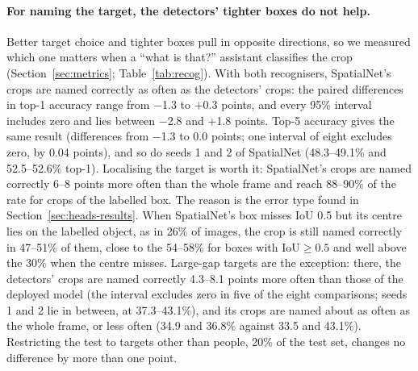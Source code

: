 \paragraph{For naming the target, the detectors' tighter boxes do not help.} Better target choice and tighter boxes pull in opposite directions, so we measured which one matters when a ``what is that?'' assistant classifies the crop (Section~\ref{sec:metrics}; Table~\ref{tab:recog}). With both recognisers, SpatialNet's crops are named correctly as often as the detectors' crops: the paired differences in top-1 accuracy range from $-$1.3 to $+$0.3 points, and every 95\% interval includes zero and lies between $-$2.8 and $+$1.8 points. Top-5 accuracy gives the same result (differences from $-$1.3 to 0.0 points; one interval of eight excludes zero, by 0.04 points), and so do seeds 1 and 2 of SpatialNet (48.3--49.1\% and 52.5--52.6\% top-1). Localising the target is worth it: SpatialNet's crops are named correctly 6--8 points more often than the whole frame and reach 88--90\% of the rate for crops of the labelled box. The reason is the error type found in Section~\ref{sec:heads-results}. When SpatialNet's box misses IoU 0.5 but its centre lies on the labelled object, as in 26\% of images, the crop is still named correctly in 47--51\% of them, close to the 54--58\% for boxes with IoU${\geq}0.5$ and well above the 30\% when the centre misses. Large-gap targets are the exception: there, the detectors' crops are named correctly 4.3--8.1 points more often than those of the deployed model (the interval excludes zero in five of the eight comparisons; seeds 1 and 2 lie in between, at 37.3--43.1\%), and its crops are named about as often as the whole frame, or less often (34.9 and 36.8\% against 33.5 and 43.1\%). Restricting the test to targets other than people, 20\% of the test set, changes no difference by more than one point.

